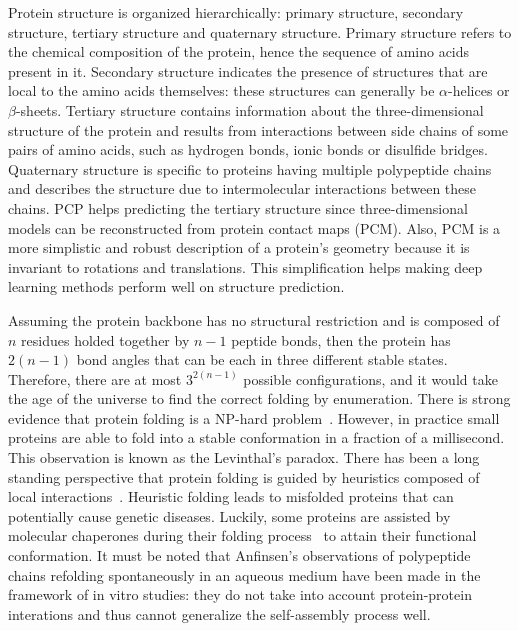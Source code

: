     Protein structure is organized hierarchically: primary structure, secondary structure, tertiary structure
    and quaternary structure. Primary structure refers to the chemical composition of the protein, hence the sequence of amino acids present in it.
    Secondary structure indicates the presence of structures that are local to the amino acids themselves:
    these structures can generally be $\alpha$-helices
    or $\beta$-sheets. Tertiary structure contains information about the three-dimensional structure of the protein and results from interactions
    between side chains of some pairs of amino acids, such as hydrogen bonds, ionic bonds or disulfide bridges.
    Quaternary structure is specific to proteins having multiple polypeptide chains and describes the structure due to intermolecular interactions between
    these chains. PCP helps predicting the tertiary structure since three-dimensional models can be reconstructed from protein contact maps (PCM).
    Also, PCM is a more simplistic and robust description of a protein's geometry because it is invariant to rotations and translations.
    This simplification helps making deep learning methods perform well on structure prediction.

    Assuming the protein backbone has no structural restriction and is composed of $n$ residues holded together by $n-1$ peptide bonds,
    then the protein has $2(n-1)$ bond angles that can be each in three different stable states. Therefore, there are at most
    $3^{2(n-1)}$ possible configurations, and it would take the age of the universe to find the correct folding by enumeration.
    There is strong evidence that protein folding is a NP-hard problem~\cite{hart1997robust}.
    However, in practice small proteins are able to fold into a stable conformation in a fraction of a millisecond.
    This observation is known as the Levinthal's paradox. There has been a long standing perspective that protein folding
    is guided by heuristics composed of local interactions~\cite{levinthal1969fold}. Heuristic folding leads to misfolded proteins
    that can potentially cause genetic diseases.
    Luckily, some proteins are assisted by molecular chaperones during their folding process~\cite{ellis1991molecular}
    to attain their functional conformation. It must be noted that Anfinsen's observations of polypeptide chains refolding
    spontaneously in an aqueous medium have been made in the framework of in vitro studies:
    they do not take into account protein-protein interations and thus cannot generalize the self-assembly process well.

